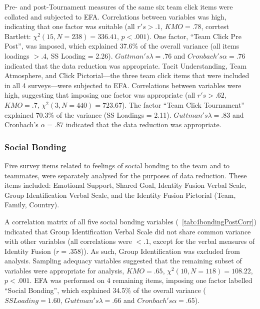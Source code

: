 Pre- and post-Tournament measures of the same six team click items were collated and subjected to EFA. Correlations between variables was high, indicating that one factor was suitable (all $r's > .1$, $KMO = .78$, corrtest Bartlett: $\chi^2(15, N = 238) = 336.41$, $p < .001$).  One factor, ``Team Click Pre Post'', was imposed, which explained 37.6\% of the overall variance (all items loadings $> .4$, SS Loading = 2.26).  $Guttman's \lambda =.76$ and $Cronbach's \alpha = .76$ indicated that the data reduction was appropriate.
Tacit Understanding, Team Atmosphere, and Click Pictorial---the three team click items that were included in all 4 surveys---were subjected to EFA.  Correlations between variables were high, suggesting that imposing one factor was appropriate (all $r's > .62$, $KMO = .7$, $\chi^2(3, N = 440) = 723.67$).  The factor ``Team Click Tournament'' explained 70.3\% of the variance (SS Loadings = 2.11).  $Guttman's \lambda =.83$ and Cronbach's $\alpha = .87$ indicated that the data reduction was appropriate.




\subsubsection{Social Bonding}
Five survey items related to feelings of social bonding to the team and to teammates, were separately analysed for the purposes of data reduction.  These items included: Emotional Support, Shared Goal, Identity Fusion Verbal Scale, Group Identification Verbal Scale, and the Identity Fusion Pictorial (Team, Family, Country).

A correlation matrix of all five social bonding variables (~\ref{tab:4bondingPostCorr}) indicated that Group Identification Verbal Scale did not share common variance with other variables (all correlations were $<.1$, except for the verbal measures of Identity Fusion ($r =.358$)). As such, Group Identification was excluded from analysis.  Sampling adequacy variables suggested that the remaining subset of variables were appropriate for analysis, $KMO = .65$, $\chi^2(10, N = 118) = 108.22$, $p < .001$.  EFA was performed on 4 remaining items, imposing one factor labelled ``Social Bonding'', which explained 34.5\% of the overall variance ($SS Loading = 1.60$, $Guttman's \lambda =.66$ and $Cronbach's \alpha = .65$).

